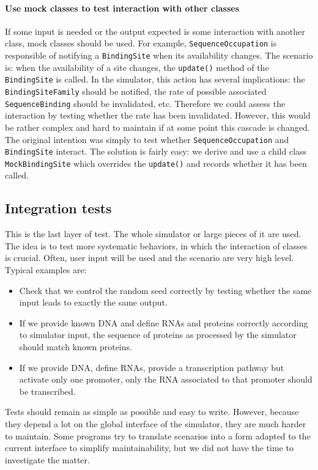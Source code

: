\paragraph{Use mock classes to test interaction with other classes} If some input is needed or the output expected is some interaction with another class, mock classes should be used. For example, \texttt{SequenceOccupation} is responsible of notifying a \texttt{BindingSite} when its availability changes. The scenario is: when the availability of a site changes, the \texttt{update()} method of the \texttt{BindingSite} is called. In the simulator, this action has several implications: the \texttt{BindingSiteFamily} should be notified, the rate of possible associated \texttt{SequenceBinding} should be invalidated, etc. Therefore we could assess the interaction by testing whether the rate has been invalidated. However, this would be rather complex and hard to maintain if at some point this cascade is changed. The original intention was simply to test whether \texttt{SequenceOccupation} and \texttt{BindingSite} interact. The solution is fairly easy: we derive and use a child class \texttt{MockBindingSite} which overrides the \texttt{update()} and records whether it has been called.

\subsection{Integration tests}

This is the last layer of test. The whole simulator or large pieces of it are used. The idea is to test more systematic behaviors, in which the interaction of classes is crucial. Often, user input will be used and the scenario are very high level. Typical examples are:
\begin{itemize}
  \item Check that we control the random seed correctly by testing whether the same input leads to exactly the same output.  
  \item If we provide known DNA and define RNAs and proteins correctly according to simulator input, the sequence of proteins as processed by the simulator should match known proteins.
  \item If we provide DNA, define RNAs, provide a transcription pathway but activate only one promoter, only the RNA associated to that promoter should be transcribed.
\end{itemize}

Tests should remain as simple as possible and easy to write. However, because they depend a lot on the global interface of the simulator, they are much harder to maintain. Some programs try to translate scenarios into a form adapted to the current interface to simplify maintainability, but we did not have the time to investigate the matter.

